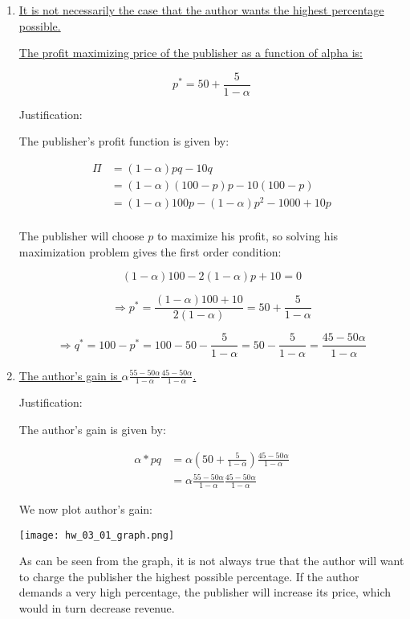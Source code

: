 \documentclass{article}
\newenvironment{solution}{\color{red}}{\color{black}}
\begin{document}
\begin{solution}

\begin{enumerate}
\item \underline{It is not necessarily the case that the author wants the highest percentage possible.}

\underline{The profit maximizing price of the publisher as a function of alpha is:}

\[ p^{*} = 50 + \frac5{1 - \alpha} \]

Justification:

The publisher's profit function is given by:

\begin{align*}
\Pi &= (1 - \alpha)pq - 10q \\
 &= (1-\alpha)(100 - p)p - 10(100-p) \\
 &= (1-\alpha)100p - (1-\alpha)p^2-1000+10p \\
\end{align*}

The publisher will choose $p$ to maximize his profit, so solving his maximization problem gives the first order condition:

\[ (1-\alpha)100-2(1-\alpha)p+10=0 \]

\[ \Rightarrow p^{*}=\frac{(1-\alpha)100+10}{2(1-\alpha)}=50+\frac{5}{1-\alpha} \]

\[ \Rightarrow q^{*}=100-p^{*}=100-50-\frac5{1-\alpha}=50-\frac5{1-\alpha}=\frac{45-50\alpha}{1-\alpha} \]

\item \underline{The author's gain is $\alpha\frac{55-50\alpha}{1-\alpha}\frac{45-50\alpha}{1-\alpha}$.}

Justification:

The author's gain is given by:

\begin{align*}
\alpha*pq &= \alpha\left(50+\frac5{1-\alpha}\right)\frac{45-50\alpha}{1-\alpha} \\
 &=\alpha\frac{55-50\alpha}{1-\alpha}\frac{45-50\alpha}{1-\alpha}
\end{align*}

We now plot author's gain:

\texttt{[image: hw\_03\_01\_graph.png]}

As can be seen from the graph, it is not always true that the author will want to charge the publisher the highest possible percentage. If the author demands a very high percentage, the publisher will increase its price, which would in turn decrease revenue.


\end{enumerate}
\end{solution}
\end{document}
